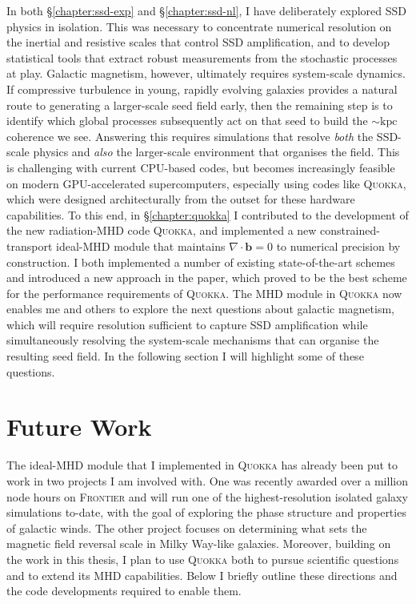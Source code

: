 \documentclass[12pt,twoside]{extreport}
\newcommand{\mVector}[1]{\bm{#1}} %
\begin{document}
In both \S\ref{chapter:ssd-exp} and \S\ref{chapter:ssd-nl}, I have deliberately explored SSD physics in isolation. This was necessary to concentrate numerical resolution on the inertial and resistive scales that control SSD amplification, and to develop statistical tools that extract robust measurements from the stochastic processes at play. Galactic magnetism, however, ultimately requires system-scale dynamics. If compressive turbulence in young, rapidly evolving galaxies provides a natural route to generating a larger-scale seed field early, then the remaining step is to identify which global processes subsequently act on that seed to build the $\sim \mathrm{kpc}$ coherence we see. Answering this requires simulations that resolve \textit{both} the SSD-scale physics and \textit{also} the larger-scale environment that organises the field. This is challenging with current CPU-based codes, but becomes increasingly feasible on modern GPU-accelerated supercomputers, especially using codes like \textsc{Quokka}, which were designed architecturally from the outset for these hardware capabilities. To this end, in \S\ref{chapter:quokka} I contributed to the development of the new radiation-MHD code \textsc{Quokka}, and implemented a new constrained-transport ideal-MHD module that maintains $\nabla\cdot\mVector{b} = 0$ to numerical precision by construction. I both implemented a number of existing state-of-the-art schemes and introduced a new approach in the paper, which proved to be the best scheme for the performance requirements of \textsc{Quokka}. The MHD module in \textsc{Quokka} now enables me and others to explore the next questions about galactic magnetism, which will require resolution sufficient to capture SSD amplification while simultaneously resolving the system-scale mechanisms that can organise the resulting seed field. In the following section I will highlight some of these questions.

\section{Future Work}

The ideal-MHD module that I implemented in \textsc{Quokka} has already been put to work in two projects I am involved with. One was recently awarded over a million node hours on \textsc{Frontier} and will run one of the highest-resolution isolated galaxy simulations to-date, with the goal of exploring the phase structure and properties of galactic winds. The other project focuses on determining what sets the magnetic field reversal scale in Milky Way-like galaxies. Moreover, building on the work in this thesis, I plan to use \textsc{Quokka} both to pursue scientific questions and to extend its MHD capabilities. Below I briefly outline these directions and the code developments required to enable them.
\end{document}
